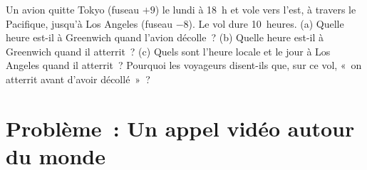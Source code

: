 \begin{exercise}[$\star\star\star$]\label{exo:g6:latitude-longitude:12}
Un avion quitte Tokyo (fuseau $+9$) le lundi à 18~h et vole vers l'est, à
travers le Pacifique, jusqu'à Los Angeles (fuseau $-8$). Le vol dure
10~heures. (a) Quelle heure est-il à Greenwich quand l'avion décolle~?
(b) Quelle heure est-il à Greenwich quand il atterrit~? (c) Quels sont
l'heure locale et le jour à Los Angeles quand il atterrit~? Pourquoi les
voyageurs disent-ils que, sur ce vol, «~on atterrit avant d'avoir
décollé~»~?
\end{exercise}

\section{Problème~: Un appel vidéo autour du monde}

